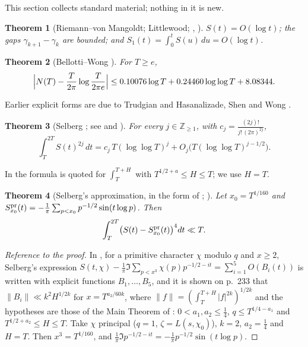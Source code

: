\documentclass[11pt,reqno]{amsart}
\theoremstyle{plain}\newtheorem{theorem}{Theorem}[section]\newtheorem{proposition}[theorem]{Proposition}\newtheorem{lemma}[theorem]{Lemma}\newtheorem{corollary}[theorem]{Corollary}
\theoremstyle{definition}\newtheorem{hypothesis}[theorem]{Hypothesis}\newtheorem{definition}[theorem]{Definition}
\theoremstyle{remark}\newtheorem{remark}[theorem]{Remark}\newtheorem{experiment}[theorem]{Experiment}\newtheorem{question}[theorem]{Question}\newtheorem{heuristic}[theorem]{Heuristic}\newtheorem{conjecture}[theorem]{Conjecture}
\begin{document}
This section collects standard material; nothing in it is new.

\begin{theorem}[Riemann--von Mangoldt; Littlewood; {\cite[Thms.~9.4, 9.9 and \S9.4]{Titchmarsh1986}}, \cite{Littlewood1924}]\label{thm:known_basic}
$S(t)=O(\log t)$; the gaps $\gamma_{k+1}-\gamma_k$ are bounded; and $S_1(t)=\int_0^tS(u)\,du=O(\log t)$.
\end{theorem}

\begin{theorem}[Bellotti--Wong {\cite{BellottiWong2025}}]\label{thm:known_BW}
For $T\ge e$,
\begin{equation}
\Bigl|N(T)-\frac T{2\pi}\log\frac T{2\pi e}\Bigr|\le0.10076\log T+0.24460\log\log T+8.08344 .
\label{eq:BW_bound}
\end{equation}
\end{theorem}
Earlier explicit forms are due to Trudgian \cite{Trudgian2014} and Hasanalizade, Shen and Wong \cite{HasanalizadeShenWong2022}.

\begin{theorem}[Selberg {\cite{Selberg1946a}}; see {\cite[p.~225]{Fujii1974}} and {\cite[\S9.25]{Titchmarsh1986}}]\label{thm:known_selberg_moments}
For every $j\in\mathbb Z_{\ge1}$, with $c_j=\frac{(2j)!}{j!\,(2\pi)^{2j}}$,
\begin{equation}
\int_T^{2T}S(t)^{2j}\,dt=c_j\,T(\log\log T)^j+O_j\bigl(T(\log\log T)^{j-1/2}\bigr).
\label{eq:selberg_moments}
\end{equation}
\end{theorem}
In \cite[p.~225]{Fujii1974} the formula is quoted for $\int_T^{T+H}$ with $T^{1/2+a}\le H\le T$; we use $H=T$.

\begin{theorem}[Selberg's approximation, in the form of {\cite[\S3, pp.~232--233]{Fujii1974}}; \cite{Selberg1946b}]\label{thm:known_selberg_approx}
Let $x_0=T^{1/160}$ and $S^{\rm pr}_{x_0}(t)=-\frac1\pi\sum_{p<x_0}p^{-1/2}\sin(t\log p)$. Then
\begin{equation}
\int_T^{2T}\bigl(S(t)-S^{\rm pr}_{x_0}(t)\bigr)^4dt\ll T .
\label{eq:selberg_approx}
\end{equation}
\end{theorem}

\begin{proof}[Reference to the proof]
In \cite[\S3]{Fujii1974}, for a primitive character $\chi$ modulo $q$ and $x\ge2$, Selberg's expression $S(t,\chi)-\frac1\pi\Im\sum_{p<x^3}\chi(p)p^{-1/2-it}=\sum_{i=1}^5O(B_i(t))$ is written with explicit functions $B_1,\dots,B_5$, and it is shown on p.~233 that $\|B_i\|\ll k^2H^{1/2k}$ for $x=T^{a_2/60k}$, where $\|f\|=(\int_T^{T+H}|f|^{2k})^{1/2k}$ and the hypotheses are those of the Main Theorem of \cite{Fujii1974}: $0<a_1,a_2\le\frac14$, $q\le T^{1/4-a_1}$ and $T^{1/2+a_2}\le H\le T$. Take $\chi$ principal ($q=1$, $\zeta=L(s,\chi_0)$), $k=2$, $a_2=\frac14$ and $H=T$. Then $x^3=T^{1/160}$, and $\frac1\pi\Im p^{-1/2-it}=-\frac1\pi p^{-1/2}\sin(t\log p)$.
\end{proof}
\end{document}
